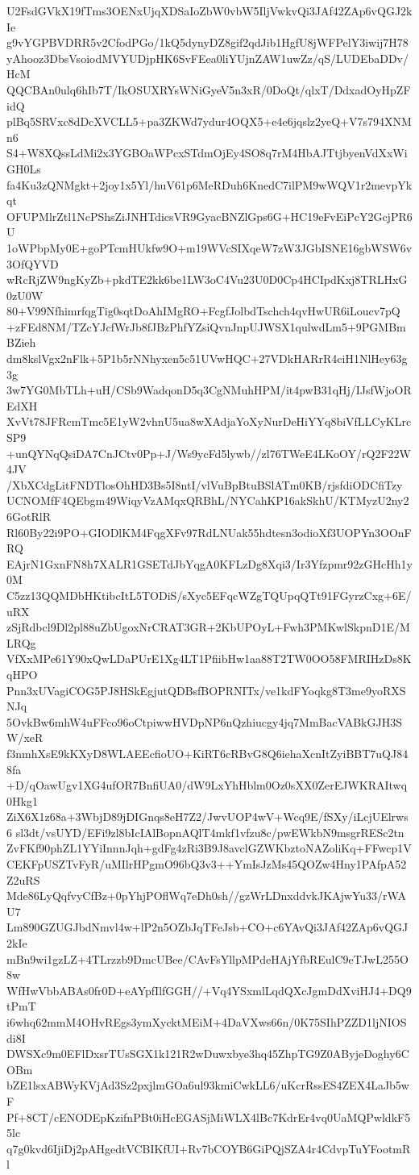 U2FsdGVkX19fTms3OENxUjqXDSaIoZbW0vbW5IljVwkvQi3JAf42ZAp6vQGJ2kIe
g9vYGPBVDRR5v2CfodPGo/1kQ5dynyDZ8gif2qdJib1HgfU8jWFPelY3iwij7H78
yAhooz3DbsVsoiodMVYUDjpHK6SvFEea0liYUjnZAW1uwZz/qS/LUDEbaDDv/HcM
QQCBAn0ulq6hIb7T/IkOSUXRYsWNiGyeV5n3xR/0DoQt/qlxT/DdxadOyHpZFidQ
plBq5SRVxc8dDcXVCLL5+pa3ZKWd7ydur4OQX5+e4e6jqslz2yeQ+V7s794XNMn6
S4+W8XQssLdMi2x3YGBOaWPcxSTdmOjEy4SO8q7rM4HbAJTtjbyenVdXxWiGH0Ls
fa4Ku3zQNMgkt+2joy1x5Yl/huV61p6MeRDuh6KnedC7ilPM9wWQV1r2mevpYkqt
OFUPMlrZtl1NcPShsZiJNHTdicsVR9GyacBNZlGps6G+HC19eFvEiPcY2GcjPR6U
1oWPbpMy0E+goPTcmHUkfw9O+m19WVcSIXqeW7zW3JGbISNE16gbWSW6v3OfQYVD
wRcRjZW9ngKyZb+pkdTE2kk6be1LW3oC4Vu23U0D0Cp4HCIpdKxj8TRLHxG0zU0W
80+V99NfhimrfqgTig0sqtDoAhIMgRO+FcgfJolbdTschch4qvHwUR6iLoucv7pQ
+zFEd8NM/TZcYJcfWrJb8fJBzPhfYZsiQvnJnpUJWSX1qulwdLm5+9PGMBmBZieh
dm8kslVgx2nFlk+5P1b5rNNhyxen5c51UVwHQC+27VDkHARrR4ciH1NlHey63g3g
3w7YG0MbTLh+uH/CSb9WadqonD5q3CgNMuhHPM/it4pwB31qHj/IJsfWjoOREdXH
XvVt78JFRcmTmc5E1yW2vhnU5ua8wXAdjaYoXyNurDeHiYYq8biVfLLCyKLrcSP9
+unQYNqQsiDA7CnJCtv0Pp+J/Ws9ycFd5lywb//zl76TWeE4LKoOY/rQ2F22W4JV
/XbXCdgLitFNDTlosOhHD3Bs5I8ntI/vlVuBpBtuBSlATm0KB/rjsfdiODCfiTzy
UCNOMfF4QEbgm49WiqyVzAMqxQRBhL/NYCahKP16akSkhU/KTMyzU2ny26GotRlR
Rl60By22i9PO+GIODlKM4FqgXFv97RdLNUak55hdtesn3odioXf3UOPYn3OOnFRQ
EAjrN1GxnFN8h7XALR1GSETdJbYqgA0KFLzDg8Xqi3/Ir3Yfzpmr92zGHcHh1y0M
C5zz13QQMDbHKtibcItL5TODiS/sXyc5EFqcWZgTQUpqQTt91FGyrzCxg+6E/uRX
zSjRdbcl9Dl2pl88uZbUgoxNrCRAT3GR+2KbUPOyL+Fwh3PMKwlSkpnD1E/MLRQg
VfXxMPe61Y90xQwLDaPUrE1Xg4LT1PfiibHw1aa88T2TW0OO58FMRIHzDs8KqHPO
Pnn3xUVagiCOG5PJ8HSkEgjutQDBsfBOPRNITx/ve1kdFYoqkg8T3me9yoRXSNJq
5OvkBw6mhW4uFFco96oCtpiwwHVDpNP6nQzhiucgy4jq7MmBacVABkGJH3SW/xeR
f3nmhXsE9kKXyD8WLAEEcfioUO+KiRT6cRBvG8Q6iehaXcnItZyiBBT7uQJ848fa
+D/qOawUgv1XG4ufOR7BnfiUA0/dW9LxYhHblm0Oz0sXX0ZerEJWKRAItwq0Hkg1
ZiX6X1z68a+3WbjD89jDIGnqs8eH7Z2/JwvUOP4wV+Wcq9E/fSXy/iLcjUElrws6
sl3dt/vsUYD/EFi9zl8bIcIAlBopnAQlT4mkf1vfzu8c/pwEWkbN9msgrRESc2tn
ZvFKf90phZL1YYiInnnJqh+gdFg4zRi3B9J8avclGZWKbztoNAZoliKq+FFwcp1V
CEKFpUSZTvFyR/uMIlrHPgmO96bQ3v3++YmIsJzMs45QOZw4Hny1PAfpA52Z2uRS
Mde86LyQqfvyCfBz+0pYhjPOflWq7eDh0sh//gzWrLDnxddvkJKAjwYu33/rWAU7
Lm890GZUGJbdNmvl4w+lP2n5OZbJqTFeJsb+CO+c6YAvQi3JAf42ZAp6vQGJ2kIe
mBn9wi1gzLZ+4TLrzzb9DmcUBee/CAvFsYllpMPdeHAjYfbREulC9eTJwL255O8w
WfHwVbbABAs0fr0D+eAYpfIlfGGH//+Vq4YSxmlLqdQXcJgmDdXviHJ4+DQ9tPmT
i6whq62mmM4OHvREgs3ymXycktMEiM+4DaVXws66n/0K75SIhPZZD1ljNIOSdi8I
DWSXc9m0EFlDxsrTUsSGX1k121R2wDuwxbye3hq45ZhpTG9Z0AByjeDoghy6COBm
bZE1lsxABWyKVjAd3Sz2pxjlmGOa6ul93kmiCwkLL6/uKcrRssES4ZEX4LaJb5wF
Pf+8CT/cENODEpKzifnPBt0iHcEGASjMiWLX4lBc7KdrEr4vq0UaMQPwldkF55lc
q7g0kvd6IjiDj2pAHgedtVCBIKfUI+Rv7bCOYB6GiPQjSZA4r4CdvpTuYFootmRl
